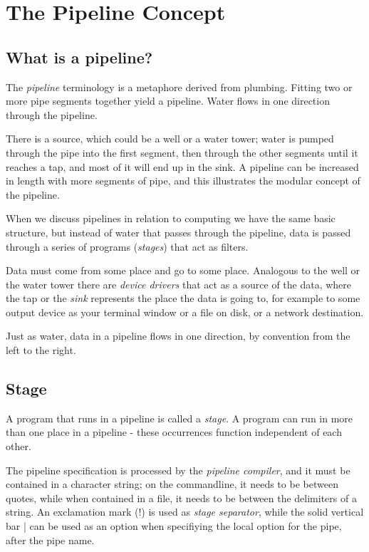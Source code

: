 \chapter{The Pipeline Concept}
\section{What is a pipeline?}
The \emph{pipeline} terminology is a metaphore derived from
plumbing. Fitting two or more pipe segments together yield a
pipeline. Water flows in one direction through the pipeline.

There is a source, which could be a well or a water tower; water is
pumped through the pipe into the first segment, then through the other
segments until it reaches a tap, and most of it will end up in the
sink. A pipeline can be increased in length with more segments of
pipe, and this illustrates the modular concept of the pipeline.

When we discuss pipelines in relation to computing we have the same
basic structure, but instead of water that passes through the
pipeline, data is passed through a series of programs (\emph{stages})
that act as filters.

Data must come from some place and go to some place. Analogous to the
well or the water tower there are \emph{device drivers} that act as a
source of the data, where the tap or the \emph{sink} represents the place the
data is going to, for example to some output device as your terminal
window or a file on disk, or a network destination.

Just as water, data in a pipeline flows in one direction, by
convention from the left to the right.
\section{Stage}
A program that runs in a pipeline is called a \emph{stage}. A program
can run in more than one place in a pipeline - these occurrences
function independent of each other. 

The pipeline specification is processed by the \emph{pipeline
  compiler}, and it must be contained in a character string; on the
commandline, it needs to be between quotes, while when contained in a
file, it needs to be between the delimiters of a \nr{} string. An
exclamation mark (!) is used as \emph{stage separator}, while the
solid vertical bar | can be used as an option when specifiying the
local option for the pipe, after the pipe name.


